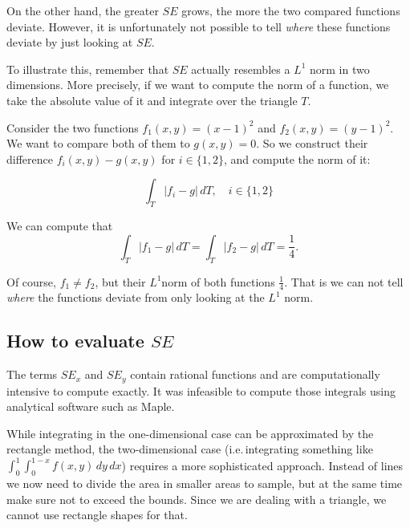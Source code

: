 \documentclass[a4paper, twoside]{article}
\newcommand{\done}[2][]{\textcolor{green!50!black}{DONE\ifthenelse{\equal{#1}{}}{}{[#1]}: #2}}
\begin{document}
On the other hand, the greater $SE$ grows, the more the two compared functions deviate. However, it is unfortunately not possible to tell \emph{where} these functions deviate by just looking at $SE$.

To illustrate this, remember that $SE$ actually resembles a $L^1$ norm in two dimensions. More precisely, if we want to compute the norm of a function, we take the absolute value of it and integrate over the triangle $T$.

Consider the two functions $f_1(x,y)=(x-1)^2$ and $f_2(x,y)=(y-1)^2$. We want to compare both of them to $g(x,y)=0$. So we construct their difference $f_i(x,y)-g(x,y)$ for $i\in\{1,2\}$, and compute the norm of it:

\begin{equation*}
  \int_T \left| f_i - g \right| \, dT, \quad i \in \{1,2 \}
\end{equation*}

We can compute that
\begin{equation*}
  \int_T \left| f_1 - g \right| \, dT = \int_T \left| f_2 - g \right| \, dT = \frac{1}{4}.
\end{equation*}

Of course, $f_1 \neq f_2$, but their $L^1$norm of both functions $\frac{1}{4}$. That is we can not tell \emph{where} the functions deviate from only looking at the $L^1$ norm.



\subsection{\texorpdfstring{How to evaluate $SE$}{How to evaluate SE}}
\label{sec:how-to-evaluate-e}

The terms $SE_x$ and $SE_y$ contain rational functions and are computationally intensive to compute exactly. It was infeasible to compute those integrals using analytical software such as Maple.

While integrating in the one-dimensional case can be approximated by the rectangle method, the two-dimensional case (i.e.\,integrating something like $\int_{0}^1 \int_0^{1-x} f(x,y)\, dy\, dx$) requires a more sophisticated approach. Instead of lines we now need to divide the area in smaller areas to sample, but at the same time make sure not to exceed the bounds. Since we are dealing with a triangle, we cannot use rectangle shapes for that.
\end{document}
